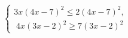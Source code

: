 \begin{ex}[type=ineq_system]
	\begin{condition}
		$\begin{cases} 3x(4x - 7)^2\leqslant2(4x - 7)^2 ,\\
			\;4x(3x - 2)^2\geqslant7(3x - 2)^2  
		\end{cases}$
	\end{condition}
\end{ex}